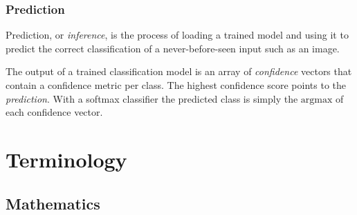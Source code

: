 \documentclass[a4paper]{report}
\begin{document}
\subsection*{Prediction}
Prediction, or \emph{inference}, is the process of loading a trained model and using it to predict the correct classification of a never-before-seen input such as an image.

The output of a trained classification model is an array of \emph{confidence} vectors that contain a confidence metric per class. The highest confidence score points to the \emph{prediction}. With a softmax classifier the predicted class is simply the $\text{argmax}$ of each confidence vector.



\chapter{Terminology}



\section{Mathematics}
\end{document}

